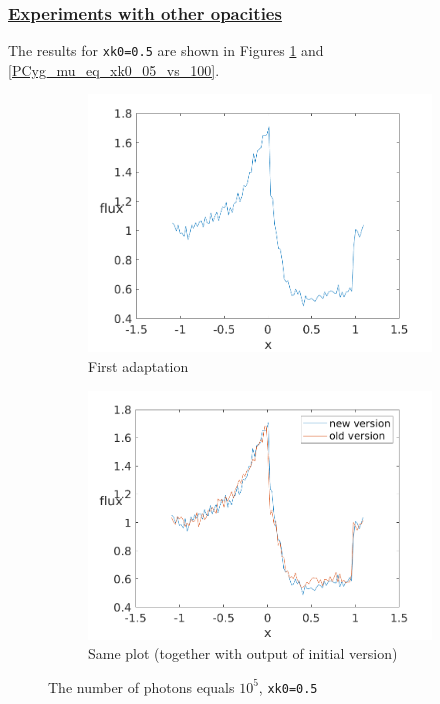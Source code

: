 \documentclass[../main/main.tex]{subfiles}
\begin{document}
\noindent{}
  
\newpage
\subsubsection{\underline{Experiments with other opacities}}
The results for \texttt{xk0=0.5} are shown in Figures \ref{PCyg_mu_eq_1xk0_05} and \ref{PCyg_mu_eq_xk0_05_vs_100}.

\begin{figure}[!htbp]
\centering
\begin{subfigure}{.5\textwidth}
\includegraphics[width=1\textwidth]{../../introductory_exercises/P_Cygni_profile_UV_resonance/data/npot5xk05alpha0beta1test1.png}
\caption{First adaptation}
\end{subfigure}%
\begin{subfigure}{.5\textwidth}
\includegraphics[width=1\textwidth]{../../introductory_exercises/P_Cygni_profile_UV_resonance/data/npot5xk05alpha0beta1test10.png}
\caption{Same plot (together with output of initial version)}
\end{subfigure}
\caption{The number of photons equals $10^{5}$, \texttt{xk0=0.5}}
\label{PCyg_mu_eq_1xk0_05}
\end{figure}
\end{document}
